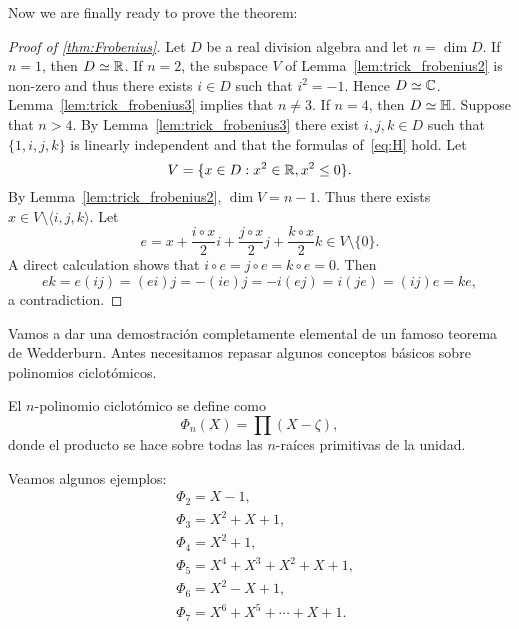 Now we are finally 
ready to prove the theorem: 

\begin{proof}[Proof of \ref{thm:Frobenius}]
	Let $D$ be a real division algebra and let $n=\dim D$. If $n=1$, then 
	$D\simeq\mathbb{R}$. If $n=2$, the subspace $V$ of Lemma~\ref{lem:trick_frobenius2} 
	is non-zero and thus there exists $i\in D$ such that 
	$i^2=-1$. Hence $D\simeq\mathbb{C}$. Lemma~\ref{lem:trick_frobenius3}
	implies that $n\ne3$. If $n=4$, then $D\simeq\mathbb{H}$. Suppose that 
	$n>4$.  By Lemma~\ref{lem:trick_frobenius3} there exist
	$i,j,k\in D$ such that $\{1,i,j,k\}$ is linearly independent 
	and that the formulas of~\eqref{eq:H} hold. Let 
	\[
		V=\{x\in D:x^2\in\mathbb{R},x^2\leq 0\}.
	\]
	By Lemma~\ref{lem:trick_frobenius2}, $\dim V=n-1$. Thus there exists 
	$x\in V\setminus\langle i,j,k\rangle$. Let 
	\[
		e=x+\frac{i\circ x}{2}i+\frac{j\circ x}{2}j+\frac{k\circ x}{2}k\in V\setminus\{0\}.
	\]
	A direct calculation shows that $i\circ e=j\circ e=k\circ e=0$. Then 
	\[
		ek=e(ij)=(ei)j=-(ie)j=-i(ej)=i(je)=(ij)e=ke,
	\]
	a contradiction. 
\end{proof}


Vamos a dar una demostración completamente elemental de un famoso teorema de
Wedderburn.  Antes necesitamos repasar algunos conceptos básicos sobre
polinomios ciclotómicos.

\begin{definition}
	El $n$-polinomio ciclotómico se define como
	\begin{equation}
		\label{eq:ciclotomico}
		\Phi_n(X)=\prod(X-\zeta),
	\end{equation}
	donde el producto se hace sobre todas las $n$-raíces primitivas de la
	unidad. 
\end{definition}

\begin{example}
	Veamos algunos ejemplos:
	\begin{align*}
		&\Phi_2=X-1,\\
		&\Phi_3=X^2+X+1,\\
		&\Phi_4=X^2+1,\\
		&\Phi_5=X^4+X^3+X^2+X+1,\\
		&\Phi_6=X^2-X+1,\\
		&\Phi_7=X^6+X^5+\cdots+X+1.
	\end{align*}
\end{example}

